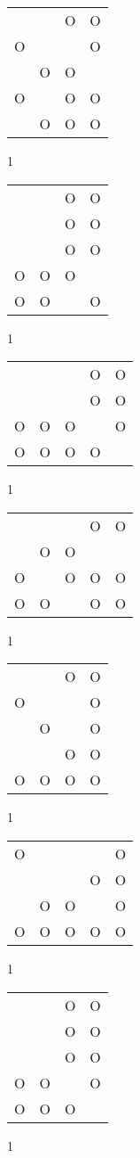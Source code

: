 \begin{tabular}{|m{0.2cm}m{0.2cm}m{0.2cm}m{0.2cm}|}\hline
 & &O&O\\
O& & &O\\
 &O&O& \\
O& &O&O\\
 &O&O&O\\
\hline\end{tabular}1
\begin{tabular}{|m{0.2cm}m{0.2cm}m{0.2cm}m{0.2cm}|}\hline
 & &O&O\\
 & &O&O\\
 & &O&O\\
O&O&O& \\
O&O& &O\\
\hline\end{tabular}1
\begin{tabular}{|m{0.2cm}m{0.2cm}m{0.2cm}m{0.2cm}m{0.2cm}|}\hline
 & & &O&O\\
 & & &O&O\\
O&O&O& &O\\
O&O&O&O& \\
\hline\end{tabular}1
\begin{tabular}{|m{0.2cm}m{0.2cm}m{0.2cm}m{0.2cm}m{0.2cm}|}\hline
 & & &O&O\\
 &O&O& & \\
O& &O&O&O\\
O&O& &O&O\\
\hline\end{tabular}1
\begin{tabular}{|m{0.2cm}m{0.2cm}m{0.2cm}m{0.2cm}|}\hline
 & &O&O\\
O& & &O\\
 &O& &O\\
 & &O&O\\
O&O&O&O\\
\hline\end{tabular}1
\begin{tabular}{|m{0.2cm}m{0.2cm}m{0.2cm}m{0.2cm}m{0.2cm}|}\hline
O& & & &O\\
 & & &O&O\\
 &O&O& &O\\
O&O&O&O&O\\
\hline\end{tabular}1
\begin{tabular}{|m{0.2cm}m{0.2cm}m{0.2cm}m{0.2cm}|}\hline
 & &O&O\\
 & &O&O\\
 & &O&O\\
O&O& &O\\
O&O&O& \\
\hline\end{tabular}1
